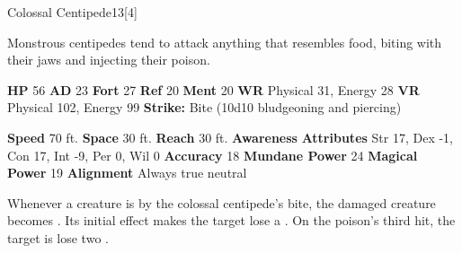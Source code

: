  
  \begin{monsection}{Colossal Centipede}{13}[4]
    \vspace{-1em}\vspace{-1em}
    \vspace{0em}

    
    Monstrous centipedes tend to attack anything that resembles food, biting with their jaws and injecting their poison.
  
    

    \begin{spellcontent}
      \begin{spelltargetinginfo}
        \pari \textbf{HP} 56 \monsep
          \textbf{AD} 23 \monsep
          \textbf{Fort} 27 \monsep
          \textbf{Ref} 20 \monsep
          \textbf{Ment} 20
        \pari \textbf{WR} Physical 31, Energy 28 \monsep
        \textbf{VR} Physical 102, Energy 99
        \pari \textbf{Strike:}
            Bite  (10d10 bludgeoning and piercing)
      \end{spelltargetinginfo}
    \end{spellcontent}
    \begin{monsterfooter}
      \pari \textbf{Speed} 70 ft. \monsep
        \textbf{Space} 30 ft. \monsep
        \textbf{Reach} 30 ft.
      \pari \textbf{Awareness} 
      \pari \textbf{Attributes}
        Str 17, Dex -1,
        Con 17, Int -9,
        Per 0, Wil 0
      \pari \textbf{Accuracy} 18 \monsep
        \textbf{Mundane Power} 24 \monsep
      \textbf{Magical Power} 19
      \pari \textbf{Alignment} Always true neutral
    \end{monsterfooter}
  \end{monsection}
    Whenever a creature is  by the colossal centipede's bite,
      the damaged creature becomes .
    Its initial effect makes the target lose a .
    On the poison's third hit, the target is lose two .
  
